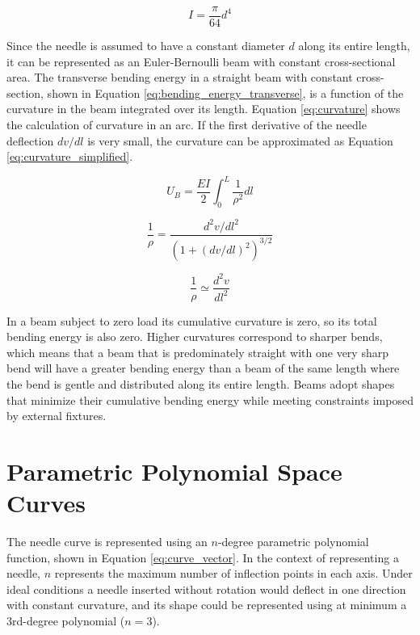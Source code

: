 \begin{equation}
\label{eq:beam_inertia}
I = \frac{\pi}{64}d^4
\end{equation}

Since the needle is assumed to have a constant diameter $d$ along its entire length, it can be represented as an Euler-Bernoulli beam with constant cross-sectional area. The transverse bending energy in a straight beam with constant cross-section, shown in Equation \ref{eq:bending_energy_transverse}, is a function of the curvature in the beam integrated over its length. Equation \ref{eq:curvature} shows the calculation of curvature in an arc. If the first derivative of the needle deflection $dv/dl$ is very small, the curvature can be approximated as Equation \ref{eq:curvature_simplified}.

\begin{equation}
\label{eq:bending_energy_transverse}
U_B = \frac{EI}{2}\int_{0}^{L}\frac{1}{\rho^2}dl
\end{equation}

\begin{equation}
\label{eq:curvature}
\frac{1}{\rho} = \frac{d^2v/dl^2}{(1+(dv/dl)^2)^{3/2}}
\end{equation}

\begin{equation}
\label{eq:curvature_simplified}
 \frac{1}{\rho} \simeq \frac{d^2v}{dl^2}
\end{equation}

In a beam subject to zero load its cumulative curvature is zero, so its total bending energy is also zero. Higher curvatures correspond to sharper bends, which means that a beam that is predominately straight with one very sharp bend will have a greater bending energy than a beam of the same length where the bend is gentle and distributed along its entire length. Beams adopt shapes that minimize their cumulative bending energy while meeting constraints imposed by external fixtures.

\section{Parametric Polynomial Space Curves}
The needle curve is represented using an $n$-degree parametric polynomial function, shown in Equation \ref{eq:curve_vector}. In the context of representing a needle, $n$ represents the maximum number of inflection points in each axis. Under ideal conditions a needle inserted without rotation would deflect in one direction with constant curvature, and its shape could be represented using at minimum a 3rd-degree polynomial ($n=3$).

